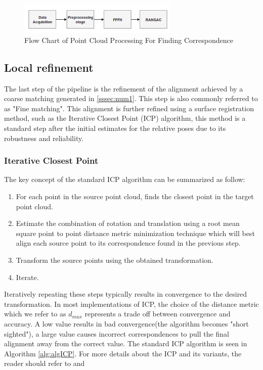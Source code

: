 \begin{figure}[!h]
\begin{center}
\includegraphics[width=3in]{diagrams/ransac.png}
\caption{Flow Chart of Point Cloud Processing For Finding Correspondence}
\label{fig:ransac}
\end{center}
\end{figure}
\subsection{Local refinement}

The last step of the pipeline is the refinement of the alignment achieved by a coarse matching generated in \ref{sssec:num1}. This step is also commonly referred to as "Fine matching". This alignment is further refined using a surface registration method, such as the Iterative Closest Point (ICP) algorithm, this method is a standard step after the initial estimates for the relative poses due to its robustness and reliability. 

\subsubsection{Iterative Closest Point}

The  key  concept  of  the  standard  ICP  algorithm  can  be summarized as follow:
\begin{enumerate}
    \item For each point in the source point cloud, finds the closest point in the target point cloud.
    \item Estimate the combination of rotation and translation using a root mean square point to point distance metric minimization technique which will best align each source point to its correspondence found in the previous step. 
    \item Transform the source points using the obtained transformation.
    \item Iterate.
\end{enumerate}

Iteratively repeating these steps typically results in convergence to the desired transformation. In most implementations of ICP, the choice of the distance metric which we refer to as $d_{max}$ represents a trade off between convergence and accuracy. A low value results in bad convergence(the algorithm becomes "short sighted"), a large value causes incorrect correspondences to pull the final alignment away from the correct value. The standard ICP algorithm is seen in Algorithm \ref{alg:algICP}. For more details about the ICP and its variants, the reader should refer to \cite{repMatching} and \cite{algIcp}

